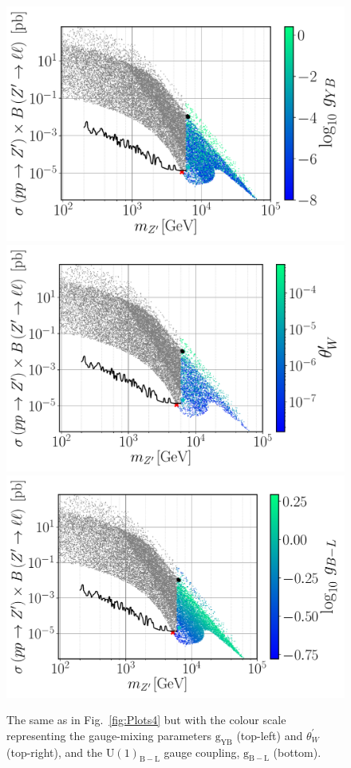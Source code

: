 \documentclass[10pt]{report}
\newcommand{\U}[1]{\mathrm{U}(1)_{\mathrm{#1}}}
\begin{document}
\begin{figure}[!htb]
	\centering
	\includegraphics[scale=0.37]{Images/BLSM_2/mZp_Xsec_gYB.pdf}
	\includegraphics[scale=0.37]{Images/BLSM_2/mZp_Xsec_twp.pdf}
	\includegraphics[scale=0.37]{Images/BLSM_2/mZp_Xsec_gBL.pdf}	
	\caption{The same as in Fig.~\ref{fig:Plots4} but with the colour scale representing the gauge-mixing parameters $\mathrm{g}_{\mathrm{YB}}$ (top-left) and $\theta_W^\prime$ (top-right), and the $\U{B-L}$ gauge coupling, $\mathrm{g}_{\mathrm{B-L}}$ (bottom).}
	\label{fig:Plots3}
\end{figure}	
\end{document}

